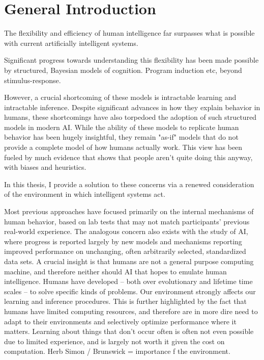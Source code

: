\chapter{General Introduction}
\label{chap:intro}

The flexibility and efficiency of human intelligence far surpasses what is possible with current artificially intelligent systems. 

Significant progress towards understanding this flexibility has been made possible by structured, Bayesian models of cognition. Program induction etc, beyond stimulus-response.

However, a crucial shortcoming of these models is intractable learning and intractable inference. Despite significant advances in how they explain behavior in humans, these shortcomings have also torpedoed the adoption of such structured models in modern AI. While the ability of these models to replicate human behavior has been hugely insightful, they remain "as-if" models that do not provide a complete model of how humans actually work. This view has been fueled by much evidence that shows that people aren't quite doing this anyway, with biases and heuristics.

In this thesis, I provide a solution to these concerns via a renewed consideration of the environment in which intelligent systems act. 

Most previous approaches have focused primarily on the internal mechanisms of human behavior, based on lab tests that may not match participants' previous real-world experience. The analogous concern also exists with the study of AI, where progress is reported largely by new models and mechanisms reporting improved performance on unchanging, often arbitrarily selected, standardized data sets. A crucial insight is that humans are not a general purpose computing machine, and therefore neither should AI that hopes to emulate human intelligence. Humans have developed -- both over evolutionary and lifetime time scales -- to solve specific kinds of problems. Our environment strongly affects our learning and inference procedures. This is further highlighted by the fact that humans have limited computing resources, and therefore are in more dire need to adapt to their environments and selectively optimize performance where it matters. Learning about things that don't occur often is often not even possible due to limited experience, and is largely not worth it given the cost on computation. 
Herb Simon / Brunswick = importance f the environment.

